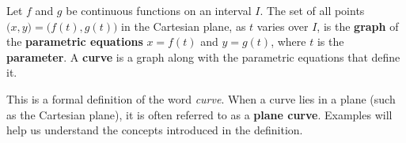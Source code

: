{Let $f$ and $g$ be continuous functions on an interval $I$. The set of all points $\big(x,y\big) = \big(f(t),g(t)\big)$ in the Cartesian plane, as $t$ varies over $I$, is the \textbf{graph} of the \textbf{parametric equations} $x=f(t)$ and $y=g(t)$, where $t$ is the \textbf{parameter}. A \textbf{curve} is a graph along with the parametric equations that define it.
}

This is a formal definition of the word \textit{curve}. When a curve lies in a plane (such as the Cartesian plane), it is often referred to as a \textbf{plane curve}. Examples will help us understand the concepts introduced in the definition.\\

